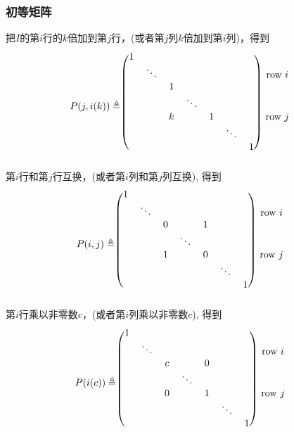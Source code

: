 \subsubsection{初等矩阵}

\begin{Definition} 把$I$的第$i$行的$k$倍加到第$j$行，(或者第$j$列$k$倍加到第$i$列)，得到
\[
P(j, i(k)) \triangleq 
\begin{blockarray}{cccccccc}
\begin{block}{(ccccccc)c}
1 &        &   &        &   &        &   & \\
  & \ddots &   &        &   &        &   & \text{row $i$} \\
  &        & 1 &        &   &        &   & \\
  &        &   & \ddots &   &        &   & \\
  &        & k &        & 1 &        &   & \text{row $j$} \\
  &        &   &        &   & \ddots &   & \\
  &        &   &        &   &        & 1 & \\
\end{block}
\end{blockarray}
\]
第$i$行和第$j$行互换，(或者第$i$列和第$j$列互换), 得到
\[
P(i, j) \triangleq 
\begin{blockarray}{cccccccc}
\begin{block}{(ccccccc)c}
1 &        &   &        &   &        &   & \\
  & \ddots &   &        &   &        &   & \text{row $i$} \\
  &        & 0 &        & 1 &        &   & \\
  &        &   & \ddots &   &        &   & \\
  &        & 1 &        & 0 &        &   & \text{row $j$} \\
  &        &   &        &   & \ddots &   & \\
  &        &   &        &   &        & 1 & \\
\end{block}
\end{blockarray}
\]
第$i$行乘以非零数$c$，(或者第$i$列乘以非零数$c$), 得到
\[
P(i(c)) \triangleq 
\begin{blockarray}{cccccccc}
\begin{block}{(ccccccc)c}
1 &        &   &        &   &        &   & \\
  & \ddots &   &        &   &        &   & \text{row $i$} \\
  &        & c &        & 0 &        &   & \\
  &        &   & \ddots &   &        &   & \\
  &        & 0 &        & 1 &        &   & \text{row $j$} \\
  &        &   &        &   & \ddots &   & \\
  &        &   &        &   &        & 1 & \\
\end{block}
\end{blockarray}
\]
\end{Definition}

